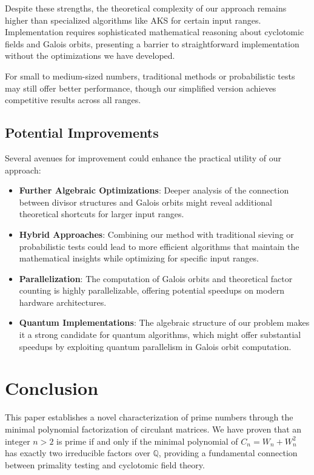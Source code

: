 Despite these strengths, the theoretical complexity of our approach remains higher than specialized algorithms like AKS for certain input ranges. Implementation requires sophisticated mathematical reasoning about cyclotomic fields and Galois orbits, presenting a barrier to straightforward implementation without the optimizations we have developed.

For small to medium-sized numbers, traditional methods or probabilistic tests may still offer better performance, though our simplified version achieves competitive results across all ranges.

\subsection{Potential Improvements}

Several avenues for improvement could enhance the practical utility of our approach:

\begin{itemize}
    \item \textbf{Further Algebraic Optimizations}: Deeper analysis of the connection between divisor structures and Galois orbits might reveal additional theoretical shortcuts for larger input ranges.
    
    \item \textbf{Hybrid Approaches}: Combining our method with traditional sieving or probabilistic tests could lead to more efficient algorithms that maintain the mathematical insights while optimizing for specific input ranges.
    
    \item \textbf{Parallelization}: The computation of Galois orbits and theoretical factor counting is highly parallelizable, offering potential speedups on modern hardware architectures.
    
    \item \textbf{Quantum Implementations}: The algebraic structure of our problem makes it a strong candidate for quantum algorithms, which might offer substantial speedups by exploiting quantum parallelism in Galois orbit computation.
\end{itemize}

\section{Conclusion}

This paper establishes a novel characterization of prime numbers through the minimal polynomial factorization of circulant matrices. We have proven that an integer $n > 2$ is prime if and only if the minimal polynomial of $C_n = W_n + W_n^2$ has exactly two irreducible factors over $\mathbb{Q}$, providing a fundamental connection between primality testing and cyclotomic field theory.

